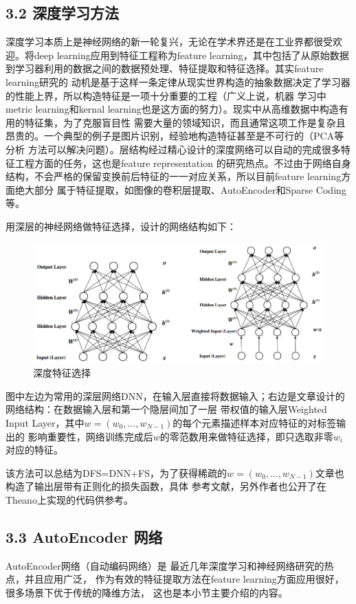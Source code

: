 \documentclass[a4paper,UTF8]{article}
\begin{document}
\subsection*{3.2 深度学习方法}
深度学习本质上是神经网络的新一轮复兴，无论在学术界还是在工业界都很受欢迎。将deep learning应用到特征工程称为feature
learning，其中包括了从原始数据到学习器利用的数据之间的数据预处理、特征提取和特征选择。其实feature learning研究的
动机是基于这样一条定律从现实世界构造的抽象数据决定了学习器的性能上界，所以构造特征是一项十分重要的工程（广义上说，机器
学习中metric learning和kernal learning也是这方面的努力）。现实中从高维数据中构造有用的特征集，为了克服盲目性
需要大量的领域知识，而且通常这项工作是复杂且昂贵的。一个典型的例子是图片识别，经验地构造特征甚至是不可行的（PCA等分析
方法可以解决问题）。层结构经过精心设计的深度网络可以自动的完成很多特征工程方面的任务，这也是feature representation
的研究热点。不过由于网络自身结构，不会严格的保留变换前后特征的一一对应关系，所以目前feature learning方面绝大部分
属于特征提取，如图像的卷积层提取、AutoEncoder和Sparse Coding等。

\cite{DBLP:conf/recomb/LiCW15}用深层的神经网络做特征选择，设计的网络结构如下：

\begin{figure}[!htbp]
  \centering
  \includegraphics[scale=0.4]{DFS.png}
  \caption{深度特征选择}
\end{figure}
图中左边为常用的深层网络DNN，在输入层直接将数据输入；右边是文章设计的网络结构：在数据输入层和第一个隐层间加了一层
带权值的输入层Weighted Input Layer，其中$w=(w_{0},...,w_{N-1})$的每个元素描述样本对应特征的对标签输出的
影响重要性，网络训练完成后$w$的零范数用来做特征选择，即只选取非零$w_{i}$对应的特征。

该方法可以总结为DFS=DNN+FS，为了获得稀疏的$w=(w_{0},...,w_{N-1})$文章也构造了输出层带有正则化的损失函数，具体
参考文献，另外作者也公开了在Theano上实现的代码供参考\cite{Theano/DFS/package}。

\subsection*{3.3 AutoEncoder 网络}
AutoEncoder网络（自动编码网络）是
最近几年深度学习和神经网络研究的热点，并且应用广泛，
作为有效的特征提取方法在feature learning方面应用很好，很多场景下优于传统的降维方法，
这也是本小节主要介绍的内容。
\end{document}
